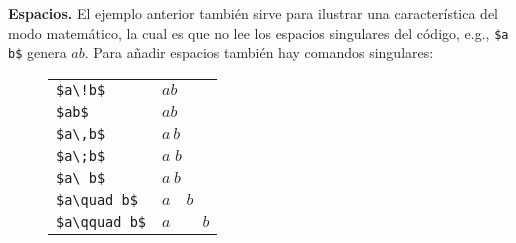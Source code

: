 \textbf{Espacios.} El ejemplo anterior también sirve para ilustrar una característica del modo matemático, la cual es que no lee los espacios singulares del código, e.g., \lstinline|$a     b$| genera $a     b$. Para añadir espacios también hay comandos singulares:
\begin{figure}[!h]
	\centering
	\begin{longtable}{ll}
		\hline \hline
		\endhead
		\hline \hline
		\endfoot

		\lstinline|$a\!b$|      & $a\!b$ \\
		\lstinline|$ab$|        & $ab$ \\
		\lstinline|$a\,b$|      & $a\,b$ \\
		\lstinline|$a\;b$|      & $a\;b$ \\
		\lstinline|$a\ b$|      & $a\ b$ \\
		\lstinline|$a\quad b$|  & $a\quad b$ \\
		\lstinline|$a\qquad b$| & $a\qquad b$ \\
	\end{longtable}
\end{figure}

